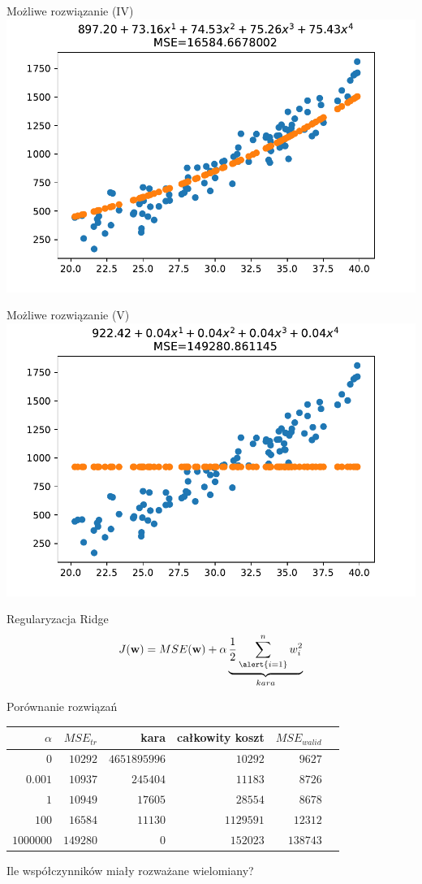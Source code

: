 \documentclass{sa}
\renewcommand{\vec}[1]{\ensuremath\mathbf{#1}}
\begin{document}
\begin{frame}{Możliwe rozwiązanie (IV)}
\includegraphics[width=\textwidth]{reg-2deg-with-noise-ridge100.pdf}
\end{frame}

\begin{frame}{Możliwe rozwiązanie (V)}
\includegraphics[width=\textwidth]{reg-2deg-with-noise-ridge1000000.pdf}
\end{frame}

\begin{frame}{Regularyzacja Ridge}
\[ J(\vec{w}) = MSE(\vec{w}) + \alpha \underbrace{\frac{1}{2}\sum_{\alert{i=1}}^n w_i^2}_{kara} \]
\end{frame}

\begin{frame}{Porównanie rozwiązań}
\centering
\begin{tabular}{rrrrrr}
$\alpha$ & $MSE_{tr}$  & kara  & całkowity koszt & $MSE_{walid}$ \\
\hline
$0$ & $10292$ & $4651895996$ & $10292$ & $9627$\\
$0.001$ & $10937$ & $245404$ & $11183$ & $8726$\\
$1$ & $10949$ & $17605$ & $28554$ & $8678$\\
$100$ & $16584$ & $11130$ & $1129591$ & $12312$\\
$1000000$ & $149280$ & $0$ & $152023$ & $138743$\\
\end{tabular}

\pause
\vfill
\alert{Ile współczynników miały rozważane wielomiany?}
\end{frame}
\end{document}

